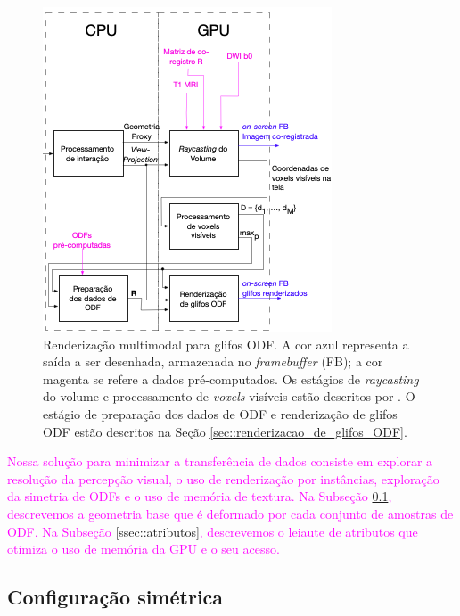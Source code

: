\begin{figure}[ht]
    \centering
    \includegraphics[width=.7\linewidth, angle=0]{figs/Esquema_Glifo/fluxograma_glifos_VMTK.png}
    \caption{
    Renderização multimodal para glifos ODF. A cor azul representa a saída a ser desenhada, armazenada no \textit{framebuffer} (FB); a cor magenta se refere a dados pré-computados. Os estágios de \textit{raycasting} do volume e processamento de \textit{voxels} visíveis estão descritos por . O estágio de preparação dos dados de ODF e renderização de glifos ODF estão descritos na Seção \ref{sec::renderizacao_de_glifos_ODF}.
    }
    \label{fig::vmtk_simplified}
\end{figure}

\textcolor{magenta}{
Nossa solução para minimizar a transferência de dados consiste em explorar a resolução da percepção visual, o uso de renderização por instâncias, exploração da simetria de ODFs e o uso de memória de textura. Na Subseção \ref{ssec::geometria_base}, descrevemos a geometria base que é deformado por cada conjunto de amostras de ODF. Na Subseção \ref{ssec::atributos}, descrevemos o leiaute de atributos que otimiza o uso de memória da GPU e o seu acesso.
}

\subsection{Configuração simétrica}
\label{ssec::geometria_base}

